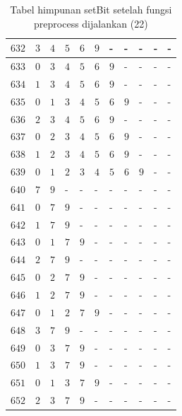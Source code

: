 \begin{appendices}
\begin{table}[H]
\begin{tabular} {|l|l|l|l|l|l|l|l|l|l|l|}
  		$ 632 $ & $ 3 $ &$ 4 $ &$ 5 $ &$ 6 $ &$ 9 $ & - &  - &  - &  - &  -   \\ \hline
  		$ 633 $ & $ 0 $ &$ 3 $ &$ 4 $ &$ 5 $ &$ 6 $ &$ 9 $ & - &  - &  - &  -   \\ \hline
  		$ 634 $ & $ 1 $ &$ 3 $ &$ 4 $ &$ 5 $ &$ 6 $ &$ 9 $ & - &  - &  - &  -   \\ \hline
  		$ 635 $ & $ 0 $ &$ 1 $ &$ 3 $ &$ 4 $ &$ 5 $ &$ 6 $ &$ 9 $ & - &  - &  -   \\ \hline
  		$ 636 $ & $ 2 $ &$ 3 $ &$ 4 $ &$ 5 $ &$ 6 $ &$ 9 $ & - &  - &  - &  -   \\ \hline
  		$ 637 $ & $ 0 $ &$ 2 $ &$ 3 $ &$ 4 $ &$ 5 $ &$ 6 $ &$ 9 $ & - &  - &  -   \\ \hline
  		$ 638 $ & $ 1 $ &$ 2 $ &$ 3 $ &$ 4 $ &$ 5 $ &$ 6 $ &$ 9 $ & - &  - &  -   \\ \hline
  		$ 639 $ & $ 0 $ &$ 1 $ &$ 2 $ &$ 3 $ &$ 4 $ &$ 5 $ &$ 6 $ &$ 9 $ & - &  -   \\ \hline
  		$ 640 $ & $ 7 $ &$ 9 $ & - &  - &  - &  - &  - &  - &  - &  -   \\ \hline
  		$ 641 $ & $ 0 $ &$ 7 $ &$ 9 $ & - &  - &  - &  - &  - &  - &  -   \\ \hline
  		$ 642 $ & $ 1 $ &$ 7 $ &$ 9 $ & - &  - &  - &  - &  - &  - &  -   \\ \hline
  		$ 643 $ & $ 0 $ &$ 1 $ &$ 7 $ &$ 9 $ & - &  - &  - &  - &  - &  -   \\ \hline
  		$ 644 $ & $ 2 $ &$ 7 $ &$ 9 $ & - &  - &  - &  - &  - &  - &  -   \\ \hline
  		$ 645 $ & $ 0 $ &$ 2 $ &$ 7 $ &$ 9 $ & - &  - &  - &  - &  - &  -   \\ \hline
  		$ 646 $ & $ 1 $ &$ 2 $ &$ 7 $ &$ 9 $ & - &  - &  - &  - &  - &  -   \\ \hline
  		$ 647 $ & $ 0 $ &$ 1 $ &$ 2 $ &$ 7 $ &$ 9 $ & - &  - &  - &  - &  -   \\ \hline
  		$ 648 $ & $ 3 $ &$ 7 $ &$ 9 $ & - &  - &  - &  - &  - &  - &  -   \\ \hline
  		$ 649 $ & $ 0 $ &$ 3 $ &$ 7 $ &$ 9 $ & - &  - &  - &  - &  - &  -   \\ \hline
  		$ 650 $ & $ 1 $ &$ 3 $ &$ 7 $ &$ 9 $ & - &  - &  - &  - &  - &  -   \\ \hline
  		$ 651 $ & $ 0 $ &$ 1 $ &$ 3 $ &$ 7 $ &$ 9 $ & - &  - &  - &  - &  -   \\ \hline
  		$ 652 $ & $ 2 $ &$ 3 $ &$ 7 $ &$ 9 $ & - &  - &  - &  - &  - &  -   \\ \hline
  	\end{tabular}\caption{Tabel himpunan setBit setelah fungsi preprocess dijalankan (22)}

\end{table}
\end{appendices}
